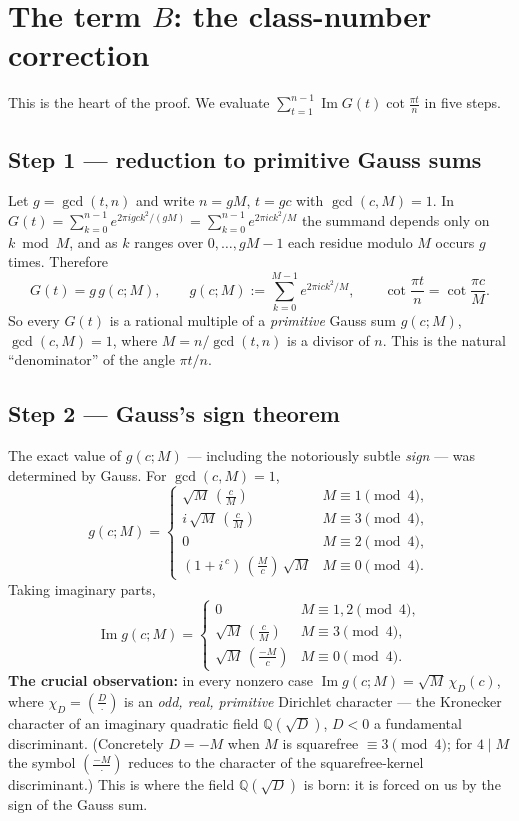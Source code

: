 \documentclass[11pt]{article}
\newcommand{\leg}[2]{\left(\frac{#1}{#2}\right)}
\DeclareMathOperator{\Imag}{Im}
\begin{document}
\section{The term $B$: the class-number correction}

This is the heart of the proof. We evaluate
$\sum_{t=1}^{n-1}\Imag G(t)\cot\frac{\pi t}{n}$ in five steps.

\subsection{Step 1 --- reduction to primitive Gauss sums}
Let $g=\gcd(t,n)$ and write $n=gM$, $t=gc$ with $\gcd(c,M)=1$. In $G(t)=\sum_{k=0}^{n-1}e^{2\pi i gck^2/(gM)}
=\sum_{k=0}^{n-1}e^{2\pi i ck^2/M}$ the summand depends only on $k\bmod M$, and as $k$ ranges over
$0,\dots,gM-1$ each residue modulo $M$ occurs $g$ times. Therefore
\[
G(t)=g\,g(c;M),\qquad g(c;M):=\sum_{k=0}^{M-1}e^{2\pi i ck^2/M},\qquad
\cot\frac{\pi t}{n}=\cot\frac{\pi c}{M}.
\]
So every $G(t)$ is a rational multiple of a \emph{primitive} Gauss sum $g(c;M)$, $\gcd(c,M)=1$, where
$M=n/\gcd(t,n)$ is a divisor of $n$. This is the natural ``denominator'' of the angle $\pi t/n$.

\subsection{Step 2 --- Gauss's sign theorem}
The exact value of $g(c;M)$ --- including the notoriously subtle \emph{sign} --- was determined by Gauss. For
$\gcd(c,M)=1$,
\[
g(c;M)=\begin{cases}
\sqrt M\,\leg{c}{M} & M\equiv1\pmod4,\\[1mm]
i\,\sqrt M\,\leg{c}{M} & M\equiv3\pmod4,\\[1mm]
0 & M\equiv2\pmod4,\\[1mm]
(1+i^{\,c})\,\leg{M}{c}\,\sqrt M & M\equiv0\pmod4.
\end{cases}
\]
Taking imaginary parts,
\[
\Imag g(c;M)=\begin{cases}0 & M\equiv1,2\pmod4,\\[1mm]
\sqrt M\,\leg{c}{M} & M\equiv3\pmod4,\\[1mm]
\sqrt M\,\leg{-M}{c} & M\equiv0\pmod4.\end{cases}
\]
\textbf{The crucial observation:} in every nonzero case $\Imag g(c;M)=\sqrt M\,\chi_D(c)$, where
$\chi_D=\leg{D}{\cdot}$ is an \emph{odd, real, primitive} Dirichlet character --- the Kronecker character of an
imaginary quadratic field $\mathbb{Q}(\sqrt D)$, $D<0$ a fundamental discriminant. (Concretely $D=-M$ when $M$ is
squarefree $\equiv3\pmod4$; for $4\mid M$ the symbol $\leg{-M}{\cdot}$ reduces to the character of the
squarefree-kernel discriminant.) This is where the field $\mathbb{Q}(\sqrt D)$ is born: it is forced on us by the
sign of the Gauss sum.
\end{document}
